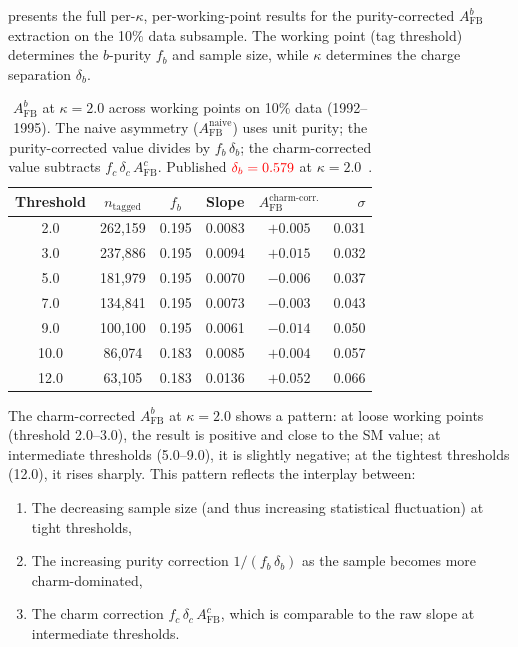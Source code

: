 \documentclass[11pt,a4paper]{article}
\newcommand{\external}[1]{\textcolor{red}{#1}}
\begin{document}
 presents the full per-$\kappa$,
per-working-point results for the purity-corrected
$A_\text{FB}^b$ extraction on the 10\% data subsample.
The working point (tag threshold) determines the $b$-purity
$f_b$ and sample size, while $\kappa$ determines the charge
separation $\delta_b$.

\begin{table}[htbp]
\centering
\caption{$A_\text{FB}^b$ at $\kappa = 2.0$ across working points
on 10\% data (1992--1995). The naive asymmetry
($A_\text{FB}^\text{naive}$) uses unit purity; the
purity-corrected value divides by $f_b\,\delta_b$; the
charm-corrected value subtracts $f_c\,\delta_c\,A_\text{FB}^c$.
Published $\external{\delta_b = 0.579}$ at $\kappa = 2.0$~\cite{LEP:EWWG:2005}.}
\label{tbl:afb_full_kappa}
\begin{tabular}{cccccr}
\toprule
Threshold & $n_\text{tagged}$ & $f_b$ & Slope &
$A_\text{FB}^\text{charm-corr.}$ & $\sigma$ \\
\midrule
2.0  & 262,159 & 0.195 & 0.0083 & $+0.005$ & 0.031 \\
3.0  & 237,886 & 0.195 & 0.0094 & $+0.015$ & 0.032 \\
5.0  & 181,979 & 0.195 & 0.0070 & $-0.006$ & 0.037 \\
7.0  & 134,841 & 0.195 & 0.0073 & $-0.003$ & 0.043 \\
9.0  & 100,100 & 0.195 & 0.0061 & $-0.014$ & 0.050 \\
10.0 &  86,074 & 0.183 & 0.0085 & $+0.004$ & 0.057 \\
12.0 &  63,105 & 0.183 & 0.0136 & $+0.052$ & 0.066 \\
\bottomrule
\end{tabular}
\end{table}

The charm-corrected $A_\text{FB}^b$ at $\kappa = 2.0$ shows a
pattern: at loose working points (threshold 2.0--3.0), the
result is positive and close to the SM value; at intermediate
thresholds (5.0--9.0), it is slightly negative; at the tightest
thresholds (12.0), it rises sharply.
This pattern reflects the interplay between:
\begin{enumerate}
\item The decreasing sample size (and thus increasing statistical
  fluctuation) at tight thresholds,
\item The increasing purity correction $1/(f_b\,\delta_b)$ as the
  sample becomes more charm-dominated,
\item The charm correction $f_c\,\delta_c\,A_\text{FB}^c$, which
  is comparable to the raw slope at intermediate thresholds.
\end{enumerate}
\end{document}
